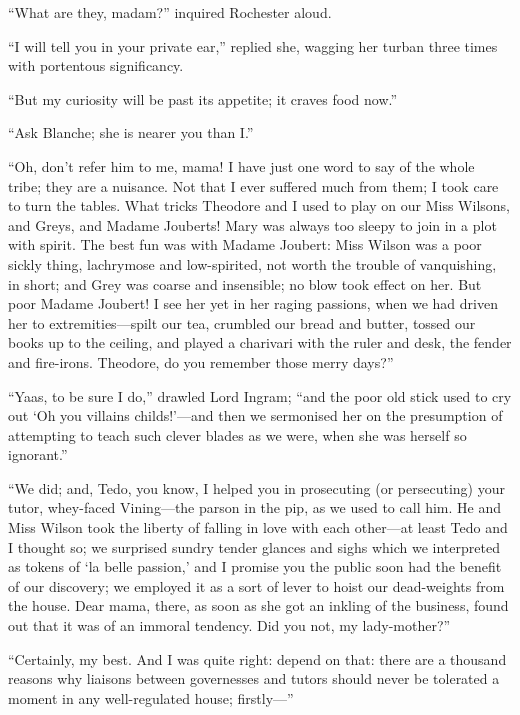 \enquote{What are they, madam?} inquired \Mr{} Rochester aloud.

\enquote{I will tell you in your private ear,} replied she, wagging her
turban three times with portentous significancy.

\enquote{But my curiosity will be past its appetite; it craves food
now.}

\enquote{Ask Blanche; she is nearer you than I\@.}

\enquote{Oh, don't refer him to me, mama! I have just one word to say
of the whole tribe; they are a nuisance. Not that I ever suffered much
from them; I took care to turn the tables. What tricks Theodore and I
used to play on our Miss Wilsons, and \Mrs{} Greys, and Madame Jouberts! 
Mary was always too sleepy to join in a plot with spirit. The best fun
was with Madame Joubert: Miss Wilson was a poor sickly thing, lachrymose
and low-spirited, not worth the trouble of vanquishing, in short; and
\Mrs{} Grey was coarse and insensible; no blow took effect on her. But
poor Madame Joubert! I see her yet in her raging passions, when we had
driven her to extremities---spilt our tea, crumbled our bread and
butter, tossed our books up to the ceiling, and played a charivari with
the ruler and desk, the fender and fire-irons. Theodore, do you
remember those merry days?}

\enquote{Yaas, to be sure I do,} drawled Lord Ingram; \enquote{and the
poor old stick used to cry out \enquote{Oh you villains childs!}---and
then we sermonised her on the presumption of attempting to teach such
clever blades as we were, when she was herself so ignorant.}

\enquote{We did; and, Tedo, you know, I helped you in prosecuting (or
persecuting) your tutor, whey-faced \Mr{} Vining---the parson in the pip,
as we used to call him. He and Miss Wilson took the liberty of falling
in love with each other---at least Tedo and I thought so; we surprised
sundry tender glances and sighs which we interpreted as tokens of
\enquote{la belle passion,} and I promise you the public soon had the
benefit of our discovery; we employed it as a sort of lever to hoist our
dead-weights from the house. Dear mama, there, as soon as she got an
inkling of the business, found out that it was of an immoral tendency. 
Did you not, my lady-mother?}

\enquote{Certainly, my best. And I was quite right: depend on that:
there are a thousand reasons why liaisons between governesses and tutors
should never be tolerated a moment in any well-regulated house;
firstly---}

